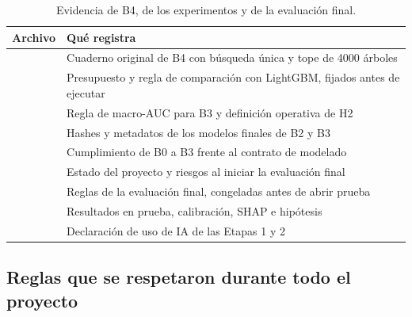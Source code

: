 \begin{table}[H]
  \centering
  \caption{Evidencia de B4, de los experimentos y de la evaluaci\'on final.}
  \label{tab:evidencia2}
  \footnotesize
  \begin{tabularx}{\textwidth}{@{}P{7.4cm} Y@{}}
    \toprule
    \textbf{Archivo} & \textbf{Qu\'e registra}\\
    \midrule
     & Cuaderno original de B4 con b\'usqueda \'unica y tope de 4000 \'arboles\\
     & Presupuesto y regla de comparaci\'on con LightGBM, fijados antes de ejecutar\\
     & Regla de macro-AUC para B3 y definici\'on operativa de H2\\
     & Hashes y metadatos de los modelos finales de B2 y B3\\
     & Cumplimiento de B0 a B3 frente al contrato de modelado\\
     & Estado del proyecto y riesgos al iniciar la evaluaci\'on final\\
     & Reglas de la evaluaci\'on final, congeladas antes de abrir prueba\\
     & Resultados en prueba, calibraci\'on, SHAP e hip\'otesis\\
     & Declaraci\'on de uso de IA de las Etapas 1 y 2\\
    \bottomrule
  \end{tabularx}
\end{table}


\subsection{Reglas que se respetaron durante todo el proyecto}

